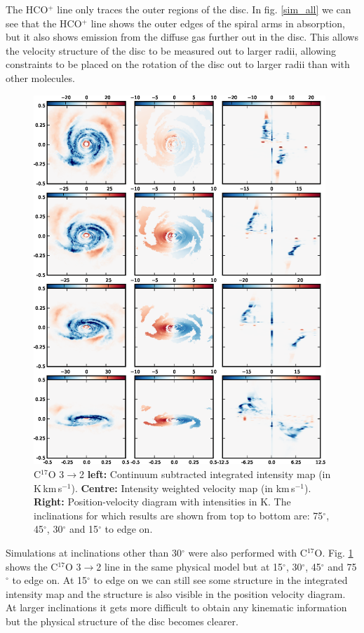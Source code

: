 \documentclass[useAMS,usenatbib]{mn2e}
\begin{document}
The HCO$^+$ line only traces the outer regions of the disc. In fig. \ref{sim_all} we can see that the HCO$^+$ line shows the outer edges of the spiral arms in absorption, but it also shows emission from the diffuse gas further out in the disc. This allows the velocity structure of the disc to be measured out to larger radii, allowing constraints to be placed on the rotation of the disc out to larger radii than with other molecules. 

\begin{figure}
 \includegraphics[width=110mm]{Figures/sim/appendix_inclinations2.eps}
 \caption{C$^{17}$O 3$\rightarrow$2 {\bf left:} Continuum subtracted integrated intensity map (in K$\,$km$\,$s$^{-1}$). {\bf Centre:} Intensity weighted velocity map (in km$\,$s$^{-1}$). {\bf Right:} Position-velocity diagram with intensities in K. The inclinations for which results are shown from top to bottom are: 75$^\circ$, 45$^\circ$, 30$^\circ$ and 15$^\circ$ to edge on.}
 \label{other_inc}
\end{figure}

Simulations at inclinations other than 30$^\circ$ were also performed with C$^{17}$O. Fig. \ref{other_inc} shows the C$^{17}$O 3$\rightarrow$2 line in the same physical model but at 15$^\circ$, 30$^\circ$, 45$^\circ$ and 75$^\circ$ to edge on. At 15$^\circ$ to edge on we can still see some structure in the integrated intensity map and the structure is also visible in the position velocity diagram. At larger inclinations it gets more difficult to obtain any kinematic information but the physical structure of the disc becomes clearer.
\end{document}
